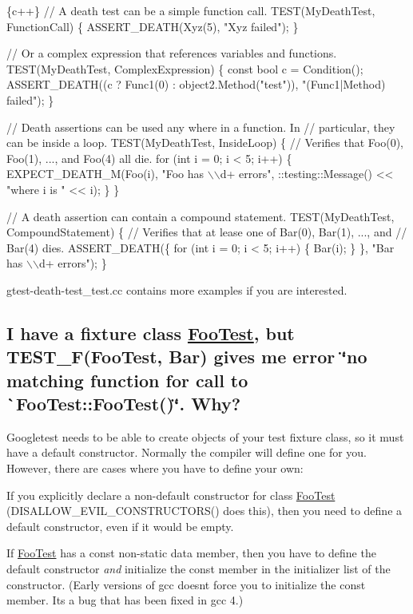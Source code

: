 \begin{DoxyCode}
\{c++\}
// A death test can be a simple function call.
TEST(MyDeathTest, FunctionCall) \{
  ASSERT\_DEATH(Xyz(5), "Xyz failed");
\}

// Or a complex expression that references variables and functions.
TEST(MyDeathTest, ComplexExpression) \{
  const bool c = Condition();
  ASSERT\_DEATH((c ? Func1(0) : object2.Method("test")),
               "(Func1|Method) failed");
\}

// Death assertions can be used any where in a function.  In
// particular, they can be inside a loop.
TEST(MyDeathTest, InsideLoop) \{
  // Verifies that Foo(0), Foo(1), ..., and Foo(4) all die.
  for (int i = 0; i < 5; i++) \{
    EXPECT\_DEATH\_M(Foo(i), "Foo has \(\backslash\)\(\backslash\)d+ errors",
                   ::testing::Message() << "where i is " << i);
  \}
\}

// A death assertion can contain a compound statement.
TEST(MyDeathTest, CompoundStatement) \{
  // Verifies that at lease one of Bar(0), Bar(1), ..., and
  // Bar(4) dies.
  ASSERT\_DEATH(\{
    for (int i = 0; i < 5; i++) \{
      Bar(i);
    \}
  \},
  "Bar has \(\backslash\)\(\backslash\)d+ errors");
\}
\end{DoxyCode}


gtest-\/death-\/test\+\_\+test.\+cc contains more examples if you are interested.

\subsection*{I have a fixture class {\ttfamily \mbox{\hyperlink{class_foo_test}{Foo\+Test}}}, but {\ttfamily T\+E\+S\+T\+\_\+\+F(\+Foo\+Test, Bar)} gives me error {\ttfamily \char`\"{}no matching function for call to \`{}\+Foo\+Test\+::\+Foo\+Test()\textquotesingle{}\char`\"{}}. Why?}

Googletest needs to be able to create objects of your test fixture class, so it must have a default constructor. Normally the compiler will define one for you. However, there are cases where you have to define your own\+:


\begin{DoxyItemize}
\item If you explicitly declare a non-\/default constructor for class {\ttfamily \mbox{\hyperlink{class_foo_test}{Foo\+Test}}} ({\ttfamily D\+I\+S\+A\+L\+L\+O\+W\+\_\+\+E\+V\+I\+L\+\_\+\+C\+O\+N\+S\+T\+R\+U\+C\+T\+O\+R\+S()} does this), then you need to define a default constructor, even if it would be empty.
\item If {\ttfamily \mbox{\hyperlink{class_foo_test}{Foo\+Test}}} has a const non-\/static data member, then you have to define the default constructor {\itshape and} initialize the const member in the initializer list of the constructor. (Early versions of {\ttfamily gcc} doesn\textquotesingle{}t force you to initialize the const member. It\textquotesingle{}s a bug that has been fixed in {\ttfamily gcc 4}.)
\end{DoxyItemize}

